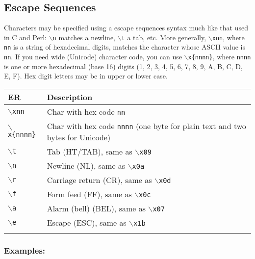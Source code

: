 \subsection{Escape Sequences}

Characters may be specified using a escape sequences syntax much like that
used in C and Perl: \texttt{$\backslash$n} matches a newline,
\texttt{$\backslash$t} a tab, etc. More generally, \texttt{$\backslash$xnn},
where \texttt{nn} is a string of hexadecimal digits, matches the character
whose ASCII value is \texttt{nn}. If you need wide (Unicode) character code,
you can use \texttt{$\backslash$x\{nnnn\}}, where \texttt{nnnn} is one or
more hexadecimal (base 16) digits (1, 2, 3, 4, 5, 6, 7, 8, 9, A, B, C, D, E, F).
Hex digit letters may be in upper or lower case.

\begin{footnotesize}
  \begin{tabularx}{\textwidth}{>{\hsize=0.3\hsize}X>{\hsize=0.7\hsize}X}\\
    \hline
    \textbf{ER} & \textbf{Description} \\
    \hline
    \texttt{$\backslash$xnn} & Char with hex code \texttt{nn} \\
    \texttt{$\backslash$x\{nnnn\}} & Char with hex code \texttt{nnnn} (one byte for plain text and two bytes for Unicode) \\
    \texttt{$\backslash$t} & Tab (HT/TAB), same as \texttt{$\backslash$x09} \\
    \texttt{$\backslash$n} & Newline (NL), same as \texttt{$\backslash$x0a} \\
    \texttt{$\backslash$r} & Carriage return (CR), same as \texttt{$\backslash$x0d} \\
    \texttt{$\backslash$f} & Form feed (FF), same as \texttt{$\backslash$x0c} \\
    \texttt{$\backslash$a} & Alarm (bell) (BEL), same as \texttt{$\backslash$x07} \\
    \texttt{$\backslash$e} & Escape (ESC), same as \texttt{$\backslash$x1b} \\
    \hline
    \\
  \end{tabularx}
\end{footnotesize}


\subsubsection{Examples:}\\

